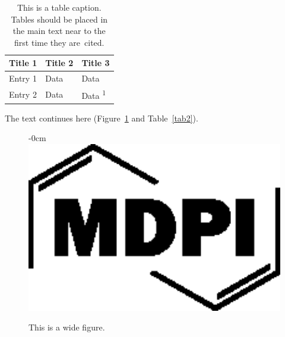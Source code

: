 \documentclass[futureinternet,article,submit,pdftex,moreauthors]{Definitions/mdpi}
\begin{document}
\begin{table}[H] 
\caption{This is a table caption. Tables should be placed in the main text near to the first time they are~cited.\label{tab1}}
\begin{tabularx}{\textwidth}{CCC}
\toprule
\textbf{Title 1}	& \textbf{Title 2}	& \textbf{Title 3}\\
\midrule
Entry 1		& Data			& Data\\
Entry 2		& Data			& Data \textsuperscript{1}\\
\bottomrule
\end{tabularx}
\end{table}

The text continues here (Figure~\ref{fig2} and Table~\ref{tab2}).

\begin{figure}[H]
\begin{adjustwidth}{-\extralength}{0cm}
\centering
\includegraphics[width=15.5cm]{Definitions/logo-mdpi}
\end{adjustwidth}
\caption{This is a wide figure.\label{fig2}}
\end{figure}  
\end{document}
